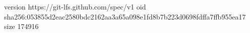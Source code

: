 version https://git-lfs.github.com/spec/v1
oid sha256:053855d2eac2580bdc2162aa3a65a098e1fd8b7b223d0698fdffa7ffb955ea17
size 174916
